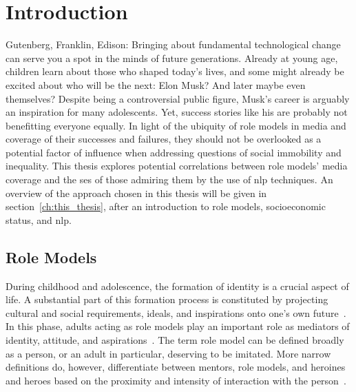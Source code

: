 \renewcommand{\imagepath}{../10-intro/img}

\chapter{Introduction}\label{ch:intro}
Gutenberg, Franklin, Edison: Bringing about fundamental technological change can serve you a spot in the minds of future generations. Already at young age, children learn about those who shaped today's lives, and some might already be excited about who will be the next: Elon Musk? And later maybe even themselves? Despite being a controversial public figure, Musk's career is arguably an inspiration for many adolescents. Yet, success stories like his are probably not benefitting everyone equally. In light of the ubiquity of role models in media and coverage of their successes and failures, they should not be overlooked as a potential factor of influence when addressing questions of social immobility and inequality. This thesis explores potential correlations between role models' media coverage and the \gls{ses} of those admiring them by the use of \gls{nlp} techniques. An overview of the approach chosen in this thesis will be given in section~\ref{ch:this_thesis}, after an introduction to role models, socioeconomic status, and \gls{nlp}.

\section{Role Models}\label{ch:role_models}
During childhood and adolescence, the formation of identity is a crucial aspect of life. A substantial part of this formation process is constituted by projecting cultural and social requirements, ideals, and inspirations onto one's own future~\autocite{mcadams_psychology_2001}. In this phase, adults acting as role models play an important role as mediators of identity, attitude, and aspirations~\autocite{hurd_role_2011-1, morgenroth_how_2015}. The term role model can be defined broadly as a person, or an adult in particular, deserving to be imitated. More narrow definitions do, however, differentiate between mentors, role models, and heroines and heroes based on the proximity and intensity of interaction with the person~\autocite{pleiss_mentors_1995}.

